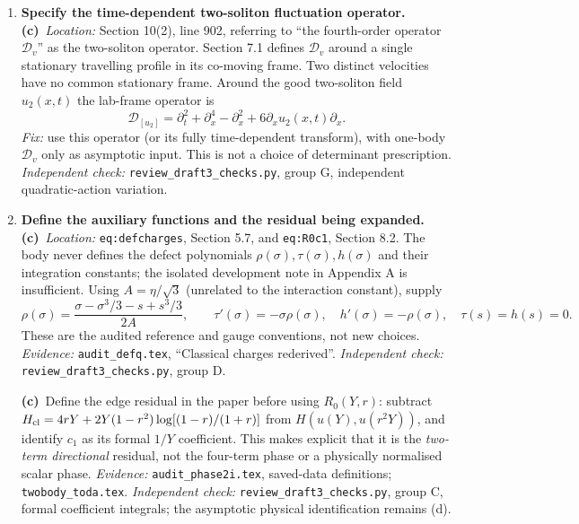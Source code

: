 \documentclass[11pt,a4paper]{article}
\newcommand{\C}{\textbf{(c)}\ }
\newcommand{\file}[1]{\nolinkurl{#1}}
\newcommand{\test}[1]{\textit{Independent check:} \file{review_draft3_checks.py}, group #1.}
\begin{document}
\begin{enumerate}[label=\textbf{R\arabic*.},leftmargin=*,itemsep=1.2em]
\C Finally, Section 10's claim that the counterterm was traced to a
specific short-wave band repeats the report's motivation more strongly
than the vacuum-matching derivation supports. The scheme audit derives a
homogeneous elastic difference; \file{good_renorm.tex} explicitly warns
against inferring whole-trace support from light-root cancellation.
\textit{Fix:} retain the PI's ranking but describe that band attribution
as motivation, not an additional demonstrated mechanism. State the
one-body and WH results as conditional traces/edge limits, and the good
acoustic scheme as an available thermodynamic condition, not the selected
physical prescription. \test{E; G; D. Completeness is not asserted.}

\item \textbf{Specify the time-dependent two-soliton fluctuation operator.}
\C \textit{Location:} Section 10(2), line 902, referring to
``the fourth-order operator $\mathcal D_v$'' as the two-soliton operator.
Section 7.1 defines $\mathcal D_v$ around a single stationary travelling
profile in its co-moving frame. Two distinct velocities have no common
stationary frame. Around the good two-soliton field $u_2(x,t)$ the lab-frame
operator is
\[
 \mathcal D_{[u_2]}=\partial_t^2+\partial_x^4-\partial_x^2
                      +6\partial_x u_2(x,t)\partial_x.
\]
\textit{Fix:} use this operator (or its fully time-dependent transform),
with one-body $\mathcal D_v$ only as asymptotic input. This is not a choice
of determinant prescription. \test{G, independent quadratic-action variation}

\item \textbf{Define the auxiliary functions and the residual being expanded.}
\C \textit{Location:} \file{eq:defcharges}, Section 5.7, and
\file{eq:R0c1}, Section 8.2. The body never defines the defect polynomials
$\rho(\sigma),\tau(\sigma),h(\sigma)$ and their integration constants;
the isolated development note in Appendix A is insufficient.
Using $A=\eta/\sqrt3$ (unrelated to the interaction constant), supply
\[
 \rho(\sigma)=\frac{\sigma-\sigma^3/3-s+s^3/3}{2A},\qquad
 \tau'(\sigma)=-\sigma\rho(\sigma),\quad
 h'(\sigma)=-\rho(\sigma),\quad \tau(s)=h(s)=0.
\]
These are the audited reference and gauge conventions, not new choices.
\textit{Evidence:} \file{audit_defq.tex}, ``Classical charges rederived''.
\test{D}

\C Define the edge residual in the paper before using $R_0(Y,r)$:
subtract $H_{\rm cl}=4rY+2Y(1-r^2)\log[(1-r)/(1+r)]$ from
$H(u(Y),u(r^2Y))$, and identify $c_1$ as its formal $1/Y$ coefficient.
This makes explicit that it is the \emph{two-term directional} residual,
not the four-term phase or a physically normalised scalar phase.
\textit{Evidence:} \file{audit_phase2i.tex}, saved-data definitions;
\file{twobody_toda.tex}. \test{C, formal coefficient integrals;
the asymptotic physical identification remains (d)}


\end{enumerate}
\end{document}
